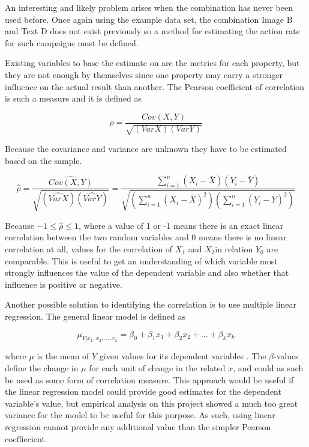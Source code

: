 \documentclass[11pt,a4paper]{report}
\begin{document}
An interesting and likely problem arises when the combination has never been used before. Once again using the example data set, the combination Image B and Text D does not exist previously so a method for estimating the action rate for such campaigns must be defined.

Existing variables to base the estimate on are the metrics for each property, but they are not enough by themselves since one property may carry a stronger influence on the actual result than another. The Pearson coefficient of correlation is such a measure and it is defined as

\begin{equation}
	\rho = \frac{Cov(X, Y)}{\sqrt{(Var X)(Var Y)}}
\end{equation}

Because the covariance and variance are unknown they have to be estimated based on the sample.

\begin{equation}
	\hat{\rho} = \frac{\widehat{Cov(X, Y)}}{\sqrt{(\widehat{Var X})(\widehat{Var Y})}} = \frac{ \sum_{i=1}^{n} (X_i - \bar{X})(Y_i - \bar{Y}) }{ \sqrt{ (\sum_{i=1}^{n} (X_i - \bar{X})^2) (\sum_{i=1}^{n} (Y_i - \bar{Y})^2) } }
\end{equation}

Because \(-1 \leq \hat{\rho} \leq 1 \), where a value of 1 or -1 means there is an exact linear correlation between the two random variables and 0 means there is no linear correlation at all, values for the correlation of \(X_1\) and \(X_2\)in relation \(Y_0\) are comparable. This is useful to get an understanding of which variable most strongly influences the value of the dependent variable and also whether that influence is positive or negative.

Another possible solution to identifying the correlation is to use multiple linear regression. The general linear model is defined as

\begin{equation}
	\mu_{Y|x_1,x_2,\dotsc,x_k} = \beta_0 + \beta_1 x_1 + \beta_2 x_2 + \dotsc + \beta_k x_k
\end{equation}

where \(\mu\) is the mean of \(Y\) given values for its dependent variables \citep{Milton2002}. The \(\beta\)-values define the change in \(\mu\) for each unit of change in the related \(x\), and could as such be used as some form of correlation measure. This approach would be useful if the linear regression model could provide good estimates for the dependent variable's value, but empirical analysis on this project showed a much too great variance for the model to be useful for this purpose. As such, using linear regression cannot provide any additional value than the simpler Pearson coeffiecient.
\end{document}
